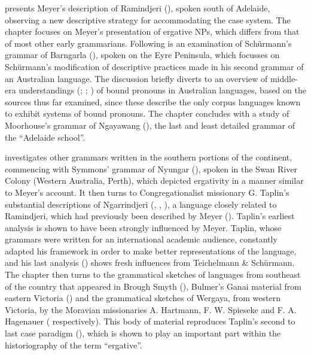  presents Meyer’s description of Ramindjeri (\citeyear{meyer_vocabulary_1843}), spoken south of Adelaide, observing a new descriptive strategy for accommodating the case system. The chapter focuses on Meyer’s presentation of ergative NPs, which differs from that of most other early grammarians. Following is an examination of Schürmann’s grammar of Barngarla (\citeyear{schurmann_vocabulary_1844}), spoken on the Eyre Peninsula, which focusses on Schürmann’s modification of descriptive practices made in his second grammar of an Australian language. The discussion briefly diverts to an overview of middle-era understandings (\citealt{ray_aboriginal_1925}; \citealt{capell_structure_1937}; \citealt{elkin_nature_1937}) of bound pronouns in Australian languages, based on the sources thus far examined, since these describe the only corpus languages known to exhibit systems of bound pronouns. The chapter concludes with a study of Moorhouse’s grammar of Ngayawang (\citeyear{moorhouse_vocabulary_1846}), the last and least detailed grammar of the “Adelaide school”. 

 investigates other grammars written in the southern portions of the continent, commencing with Symmons’ grammar of Nyungar (\citeyear{symmons_grammatical_1841}), spoken in the Swan River Colony (Western Australia, Perth), which depicted ergativity in a manner similar to Meyer’s account. It then turns to Congregationalist missionary G. Taplin’s substantial descriptions of Ngarrindjeri (\citeyear{taplin_vocabulary_1867}, \citeyear{taplin_notes_1872}, \citeyear{taplin_grammar_1878}), a language closely related to Ramindjeri, which had previously been described by Meyer (\citeyear{meyer_vocabulary_1843}). Taplin’s earliest analysis is shown to have been strongly influenced by Meyer. Taplin, whose grammars were written for an international academic audience, constantly adapted his framework in order to make better representations of the language, and his last analysis (\citeyear{taplin_grammar_1878}) shows fresh influences from Teichelmann \& Schürmann. The chapter then turns to the grammatical sketches of languages from southeast of the country that appeared in Brough Smyth (\citeyear{thomas_succinct_1878}), Bulmer’s Ganai material from eastern Victoria (\citeyear[24--26]{bulmer_language_1878}) and the grammatical sketches of Wergaya, from western Victoria, by the Moravian missionaries A. Hartmann, F. W. Spieseke and F. A. Hagenauer (\citeyear[50--52, 56--58, 39--43]{hagenauer_language_1878} respectively). This body of material reproduces Taplin’s second to last case paradigm (\citeyear{taplin_notes_1872}), which is shown to play an important part within the historiography of the term “ergative”.

